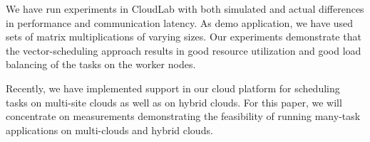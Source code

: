We have run experiments in CloudLab with both simulated and actual
differences in performance and communication latency. As demo
application, we have used sets of matrix multiplications of varying
sizes. Our experiments demonstrate that the vector-scheduling
approach results in good resource utilization and good load balancing
of the tasks on the worker nodes.

Recently, we have implemented support in our cloud platform for
scheduling tasks on multi-site clouds as well as on hybrid clouds.
For this paper, we will concentrate on measurements demonstrating the
feasibility of running many-task applications on multi-clouds and
hybrid clouds. 